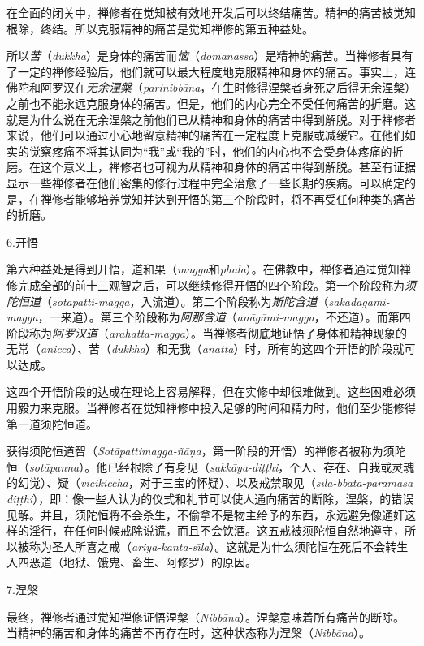 在全面的闭关中，禅修者在觉知被有效地开发后可以终结痛苦。精神的痛苦被觉知根除，终结。所以克服精神的痛苦是觉知禅修的第五种益处。

\1所以{\it 苦}（{\it dukkha}）是身体的痛苦而{\it 恼}（{\it domanassa}）是精神的痛苦。当禅修者具有了一定的禅修经验后，他们就可以最大程度地克服精神和身体的痛苦。事实上，连佛陀和阿罗汉在{\it 无余涅槃}（{\it parinibb\= ana}，在生时修得涅槃者身死之后得无余涅槃）之前也不能永远克服身体的痛苦。但是，他们的内心完全不受任何痛苦的折磨。这就是为什么说在无余涅槃之前他们已从精神和身体的痛苦中得到解脱。对于禅修者来说，他们可以通过小心地留意精神的痛苦在一定程度上克服或减缓它。在他们如实的觉察疼痛不将其认同为“我”或“我的”时，他们的内心也不会受身体疼痛的折磨。在这个意义上，禅修者也可视为从精神和身体的痛苦中得到解脱。甚至有证据显示一些禅修者在他们密集的修行过程中完全治愈了一些长期的疾病。可以确定的是，在禅修者能够培养觉知并达到开悟的第三个阶段时，将不再受任何种类的痛苦的折磨。

\sssubsectnon 6.开悟

第六种益处是得到开悟，道和果（{\it magga}和{\it phala}）。在佛教中，禅修者通过觉知禅修完成全部的前十三观智之后，可以继续修得开悟的四个阶段。第一个阶段称为{\it 须陀恒道}（{\it sot\=apatti-magga}，入流道）。第二个阶段称为{\it 斯陀含道}（{\it sakad\=ag\=ami-magga}，一来道）。第三个阶段称为{\it 阿那含道}（{\it an\=ag\=ami-magga}，不还道）。而第四阶段称为{\it 阿罗汉道}（{\it arahatta-magga}）。当禅修者彻底地证悟了身体和精神现象的无常（{\it anicca}）、苦（{\it dukkha}）和\1无我（{\it anatta}）时，所有的这四个开悟的阶段就可以达成。

这四个开悟阶段的达成在理论上容易解释，但在实修中却很难做到。这些困难必须用毅力来克服。当禅修者在觉知禅修中投入足够的时间和精力时，他们至少能修得第一道须陀恒道。

获得须陀恒道智（{\it Sot\=apattimagga-\~n\=a\d na}，第一阶段的开悟）的禅修者被称为须陀恒（{\it sot\=apanna}）。他已经根除了有身见（{\it sakk\=aya-di\d t\d thi}，个人、存在、自我或灵魂的幻觉）、疑（{\it vicikicch\=a}，对于三宝的怀疑）、以及戒禁取见（{\it s\=\i la-bbata-par\=am\=asa di\d t\d thi}），即：像一些人认为的仪式和礼节可以使人通向痛苦的断除，涅槃，的错误见解。并且，须陀恒将不会杀生，不偷拿不是物主给予的东西，永远避免像通奸这样的淫行，在任何时候戒除说谎，而且不会饮酒。这五戒被须陀恒自然地遵守，所以被称为圣人所喜之戒（{\it ariya-kanta-s\=\i la}）。这就是为什么须陀恒在死后不会转生入四恶道（地狱、饿鬼、畜生、阿修罗）的原因。

\sssubsectnon 7.涅槃

最终，禅修者通过觉知禅修证悟涅槃（{\it Nibb\=ana}）。涅槃意味着所有痛苦的断除。当精神的痛苦和身体的痛苦不再存在时，这种状态称为涅槃（{\it Nibb\=ana}）。

